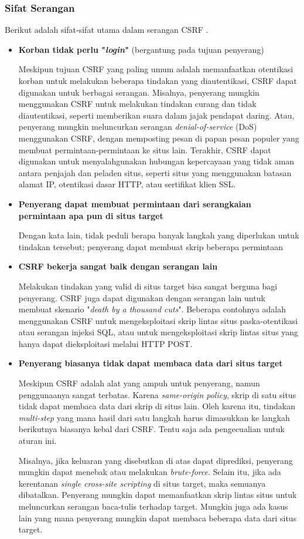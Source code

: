 \documentclass{article}
\begin{document}
\subsubsection{Sifat Serangan}
Berikut adalah sifat-sifat utama dalam serangan CSRF \cite{blatz2007csrf}.
\begin{itemize}
\item \textbf{Korban tidak perlu "\textit{login}" }(bergantung pada tujuan penyerang)

Meskipun tujuan CSRF yang paling umum adalah memanfaatkan otentikasi korban untuk melakukan beberapa tindakan yang diautentikasi, CSRF dapat digunakan untuk berbagai serangan. Misalnya, penyerang mungkin menggunakan CSRF untuk melakukan tindakan curang dan tidak diautentikasi, seperti memberikan suara dalam jajak pendapat daring. Atau, penyerang mungkin meluncurkan serangan \textit{denial-of-service} (DoS) menggunakan CSRF, dengan memposting pesan di papan pesan populer yang membuat permintaan-permintaan ke situs lain. Terakhir, CSRF dapat digunakan untuk menyalahgunakan hubungan kepercayaan yang tidak aman antara penjajah dan peladen situs, seperti situs yang menggunakan batasan alamat IP, otentikasi dasar HTTP, atau sertifikat klien SSL.
\item \textbf{Penyerang dapat membuat permintaan dari serangkaian permintaan apa pun di situs target}

Dengan kata lain, tidak peduli berapa banyak langkah yang diperlukan untuk tindakan tersebut; penyerang dapat membuat skrip beberapa permintaan
\item \textbf{CSRF bekerja sangat baik dengan serangan lain}

Melakukan tindakan yang valid di situs target bisa sangat berguna bagi penyerang. CSRF juga dapat digunakan dengan serangan lain untuk membuat skenario "\textit{death by a thousand cuts}". Beberapa contohnya adalah menggunakan CSRF untuk mengeksploitasi skrip lintas situs paska-otentikasi atau serangan injeksi SQL, atau untuk mengeksploitasi skrip lintas situs yang hanya dapat dieksploitasi melalui HTTP POST.
\item \textbf{Penyerang biasanya tidak dapat membaca data dari situs target}

Meskipun CSRF adalah alat yang ampuh untuk penyerang, namun penggunaanya sangat terbatas. Karena \textit{same-origin policy}, skrip di satu situs tidak dapat membaca data dari skrip di situs lain. Oleh karena itu, tindakan \textit{multi-step} yang mana hasil dari satu langkah harus dimasukkan ke langkah berikutnya biasanya kebal dari CSRF. Tentu saja ada pengecualian untuk aturan ini. 

Misalnya, jika keluaran yang disebutkan di atas dapat diprediksi, penyerang mungkin dapat menebak atau melakukan  \textit{brute-force}. Selain itu, jika ada kerentanan \textit{single cross-site scripting} di situs target, maka semuanya dibatalkan. Penyerang mungkin dapat memanfaatkan skrip lintas situs untuk meluncurkan serangan baca-tulis terhadap target. Mungkin juga ada kasus lain yang mana penyerang mungkin dapat membaca beberapa data dari situs target.
\end{itemize}
\end{document}
